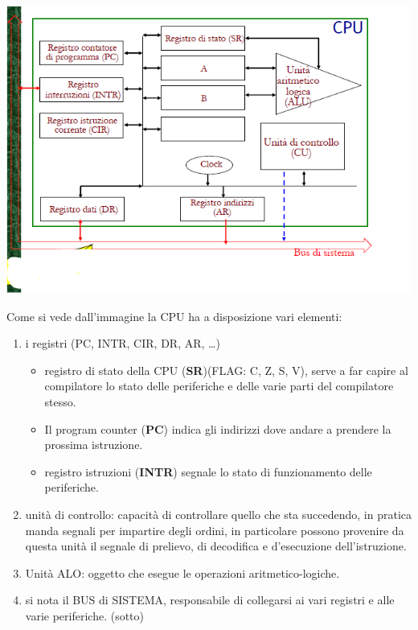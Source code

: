 \documentclass[
  paper=a4,
  oneside  ,captions=tableheading
]{scrbook}
\providecommand{\tightlist}{%
  \setlength{\itemsep}{0pt}\setlength{\parskip}{0pt}}
\begin{document}
\includegraphics{./image/image-20201111191808017.png}

Come si vede dall'immagine la CPU ha a disposizione vari elementi:

\begin{enumerate}
\def\labelenumi{\arabic{enumi}.}
\tightlist
\item
  i registri (PC, INTR, CIR, DR, AR, \ldots)

  \begin{itemize}
  \tightlist
  \item
    registro di stato della CPU (\textbf{SR})(FLAG: C, Z, S, V), serve a
    far capire al compilatore lo stato delle periferiche e delle varie
    parti del compilatore stesso.
  \item
    Il program counter (\textbf{PC}) indica gli indirizzi dove andare a
    prendere la prossima istruzione.
  \item
    registro istruzioni (\textbf{INTR}) segnale lo stato di
    funzionamento delle periferiche.
  \end{itemize}
\item
  unità di controllo: capacità di controllare quello che sta succedendo,
  in pratica manda segnali per impartire degli ordini, in particolare
  possono provenire da questa unità il segnale di prelievo, di
  decodifica e d'esecuzione dell'istruzione.
\item
  Unità ALO: oggetto che esegue le operazioni aritmetico-logiche.
\item
  si nota il BUS di SISTEMA, responsabile di collegarsi ai vari registri
  e alle varie periferiche. (sotto)
\end{enumerate}
\end{document}
